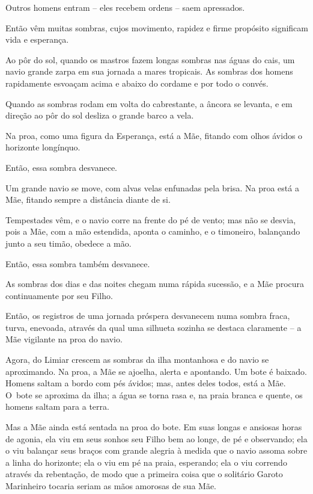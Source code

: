 Outros homens entram -- eles recebem ordens -- saem apressados.

\smallskip
Então vêm muitas sombras, cujos movimento, rapidez e firme propósito
significam vida e esperança.

\smallskip
Ao pôr do sol, quando os mastros fazem longas sombras nas águas do cais,
um navio grande zarpa em sua jornada a mares tropicais. As sombras dos
homens rapidamente esvoaçam acima e abaixo do cordame e por todo o
convés.

Quando as sombras rodam em volta do cabrestante, a âncora se levanta, e
em direção ao pôr do sol desliza o grande barco a vela.

Na proa, como uma figura da Esperança, está a Mãe, fitando com olhos
ávidos o horizonte longínquo.

Então, essa sombra desvanece.

\smallskip
Um grande navio se move, com alvas velas enfunadas pela brisa. Na proa
está a Mãe, fitando sempre a distância diante de si.

Tempestades vêm, e o navio corre na frente do pé de vento; mas não se
desvia, pois a Mãe, com a mão estendida, aponta o caminho, e o
timoneiro, balançando junto a seu timão, obedece a mão.

Então, essa sombra também desvanece.

\smallskip
As sombras dos dias e das noites chegam numa rápida sucessão, e a Mãe
procura continuamente por seu Filho.

\smallskip
Então, os registros de uma jornada próspera desvanecem numa sombra
fraca, turva, enevoada, através da qual uma silhueta sozinha se destaca
claramente -- a Mãe vigilante na proa do navio.

\smallskip
Agora, do Limiar crescem as sombras da ilha montanhosa e do navio se
aproximando. Na proa, a Mãe se ajoelha, alerta e apontando. Um bote é
baixado. Homens saltam a bordo com pés ávidos; mas, antes deles todos,
está a Mãe. O~bote se aproxima da ilha; a água se torna rasa e, na praia
branca e quente, os homens saltam para a terra.

Mas a Mãe ainda está sentada na proa do bote. Em suas longas e ansiosas
horas de agonia, ela viu em seus sonhos seu Filho bem ao longe, de pé e
observando; ela o viu balançar seus braços com grande alegria à medida
que o navio assoma sobre a linha do horizonte; ela o viu em pé na praia,
esperando; ela o viu correndo através da rebentação, de modo que a
primeira coisa que o solitário Garoto Marinheiro tocaria seriam as mãos
amorosas de sua Mãe.

